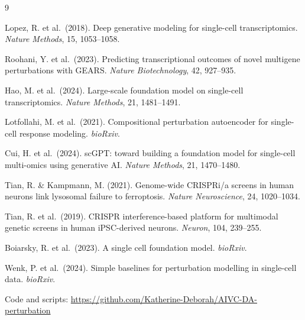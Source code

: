 \documentclass[11pt,letterpaper]{article}
\begin{document}

\begin{thebibliography}{9}

Lopez, R. et al.\ (2018).
Deep generative modeling for single-cell transcriptomics.
\textit{Nature Methods}, 15, 1053--1058.

Roohani, Y. et al.\ (2023).
Predicting transcriptional outcomes of novel multigene perturbations with GEARS.
\textit{Nature Biotechnology}, 42, 927--935.

Hao, M. et al.\ (2024).
Large-scale foundation model on single-cell transcriptomics.
\textit{Nature Methods}, 21, 1481--1491.

Lotfollahi, M. et al.\ (2021).
Compositional perturbation autoencoder for single-cell response modeling.
\textit{bioRxiv}.

Cui, H. et al.\ (2024).
scGPT: toward building a foundation model for single-cell multi-omics using generative AI.
\textit{Nature Methods}, 21, 1470--1480.

Tian, R. \& Kampmann, M. (2021).
Genome-wide CRISPRi/a screens in human neurons link lysosomal failure to ferroptosis.
\textit{Nature Neuroscience}, 24, 1020--1034.

Tian, R. et al.\ (2019).
CRISPR interference-based platform for multimodal genetic screens in human iPSC-derived neurons.
\textit{Neuron}, 104, 239--255.

Boiarsky, R. et al.\ (2023).
A single cell foundation model.
\textit{bioRxiv}.

Wenk, P. et al.\ (2024).
Simple baselines for perturbation modelling in single-cell data.
\textit{bioRxiv}.

\end{thebibliography}

\vspace{6pt}
{\small Code and scripts: \url{https://github.com/Katherine-Deborah/AIVC-DA-perturbation}}
\end{document}
